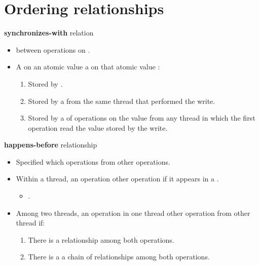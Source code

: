 \section{Ordering relationships}

\begin{frame}[t]{\textbf{synchronizes-with} relation}
\begin{itemize}
  \item {} between operations on .

  \item A  on an atomic value
        a  on that atomic value :

    \begin{enumerate}[i]
      \item Stored by .

      \item Stored by a  from the same thread that performed the write.

      \item Stored by a  of  operations
            on the value from any thread in which the first operation
            read the value stored by the write.
    \end{enumerate}
\end{itemize}
\end{frame}


\begin{frame}[t]{\textbf{happens-before} relationship}
\begin{itemize}
  \item Specified which operations  from other operations.

  \item Within a thread, an operation  other operation if it
        appears in a 
        .
    \begin{itemize}
      \item {}.
    \end{itemize}

  \item Among two threads, an operation in one thread  other operation from other thread if:
    \begin{enumerate}[i]
      \item There is a  relationship among both operations.
      \item There is a  a  chain of relationships among both operations.
    \end{enumerate}
\end{itemize}
\end{frame}

